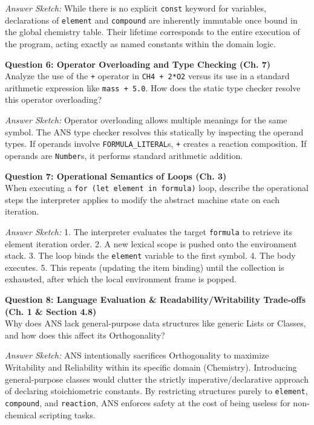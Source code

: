 \documentclass[11pt,a4paper]{article}
\newcommand{\code}[1]{\texttt{#1}}
\begin{document}
\textit{Answer Sketch:} While there is no explicit \code{const} keyword for variables, declarations of \code{element} and \code{compound} are inherently immutable once bound in the global chemistry table. Their lifetime corresponds to the entire execution of the program, acting exactly as named constants within the domain logic.

\vspace{10pt}
\textbf{Question 6: Operator Overloading and Type Checking (Ch. 7)} \\
Analyze the use of the \code{+} operator in \code{CH4 + 2*O2} versus its use in a standard arithmetic expression like \code{mass + 5.0}. How does the static type checker resolve this operator overloading?

\textit{Answer Sketch:} Operator overloading allows multiple meanings for the same symbol. The ANS type checker resolves this statically by inspecting the operand types. If operands involve \code{FORMULA\_LITERAL}s, \code{+} creates a reaction composition. If operands are \code{Number}s, it performs standard arithmetic addition.

\vspace{10pt}
\textbf{Question 7: Operational Semantics of Loops (Ch. 3)} \\
When executing a \code{for (let element in formula)} loop, describe the operational steps the interpreter applies to modify the abstract machine state on each iteration.

\textit{Answer Sketch:} 1. The interpreter evaluates the target \code{formula} to retrieve its element iteration order. 2. A new lexical scope is pushed onto the environment stack. 3. The loop binds the \code{element} variable to the first symbol. 4. The body executes. 5. This repeats (updating the item binding) until the collection is exhausted, after which the local environment frame is popped.

\vspace{10pt}
\textbf{Question 8: Language Evaluation \& Readability/Writability Trade-offs (Ch. 1 \& Section 4.8)} \\
Why does ANS lack general-purpose data structures like generic Lists or Classes, and how does this affect its Orthogonality?

\textit{Answer Sketch:} ANS intentionally sacrifices Orthogonality to maximize Writability and Reliability within its specific domain (Chemistry). Introducing general-purpose classes would clutter the strictly imperative/declarative approach of declaring stoichiometric constants. By restricting structures purely to \code{element}, \code{compound}, and \code{reaction}, ANS enforces safety at the cost of being useless for non-chemical scripting tasks.
\end{document}

